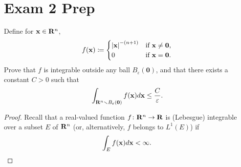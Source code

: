 \section{Exam 2 Prep}
\begin{problem}
Define for $\mathbf{x}\in\mathbf{R}^n$,
\[
f(\mathbf{x})\coloneqq
\begin{cases}
\left|\mathbf{x}\right|^{-(n+1)}&\text{if $\mathbf{x}\neq \mathbf{0}$,}\\
0&\text{if $\mathbf{x}=\mathbf{0}$.}
\end{cases}
\]
Prove that $f$ is integrable outside any ball $B_\varepsilon(\mathbf{0})$,
and that there exists a constant $C>0$ such that
\[
\int_{\mathbf{R}^n\smallsetminus B_\varepsilon(\mathbf{0})}f(\mathbf{x}) d \mathbf{x}\leq\frac{C}{\varepsilon}.
\]
\end{problem}
\begin{proof}
Recall that a real-valued function $f\colon\mathbf{R}^n\to\mathbf{R}$ is (Lebesgue)
integrable over a subset $E$ of $\mathbf{R}^n$ (or, alternatively, $f$ belongs to
$L^1(E)$) if
\[
\int_E f(\mathbf{x}) d \mathbf{x}<\infty.
\]


\end{proof}
